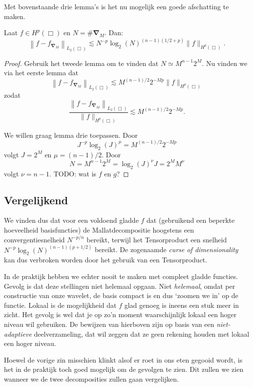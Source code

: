 Met bovenstaande drie lemma's is het nu mogelijk een goede afschatting te maken.
\begin{stelling}
\label{thm:fouttensor}
  Laat $f \in H^p(\Box)$ en $N = \#\boldsymbol{\nabla}_M$. Dan:
  \[
  \left\| f - f_{\boldsymbol\nabla_M} \right\|_{L_2(\Box)} \lesssim N^{-p} \log_2(N)^{(n-1)(1/2 + p)} \| f \|_{H^p(\Box)}.
  \]
\end{stelling}
\begin{proof}
  Gebruik het tweede lemma om te vinden dat $N \simeq M^{n-1}2^M$. Nu vinden we via het eerste lemma dat
  \[
  \left\| f - f_{\boldsymbol\nabla_M} \right\|_{L_2(\Box)} \lesssim M^{(n-1)/2}2^{-Mp}\| f \|_{H^p(\Box)}
  \]
  zodat
  \[
  \frac{\left\| f - f_{\boldsymbol\nabla_M}  \right\|_{L_2(\Box)}}{\| f \|_{H^p(\Box)}} \lesssim M^{(n-1)/2}2^{-Mp}.
  \]

  We willen graag lemma drie toepassen. Door
  \[
  J^{-p}\log_2(J)^\mu = M^{(n-1)/2} 2^{-Mp}
  \]
  volgt $J = 2^M$ en $\mu = (n-1)/2$. Door
  \[
  N = M^{n-1}2^M = \log_2(J)^\nu J = 2^M M^\nu
  \] volgt $\nu = n-1$. TODO: wat is $f$ en $g$?
\end{proof}

\subsection{Vergelijkend}
We vinden dus dat voor een voldoend gladde $f$ dat (gebruikend een beperkte hoeveelheid basisfuncties) de Mallatdecompositie hoogstens een convergentiesnelheid $N^{-p/n}$ bereikt, terwijl het Tensorproduct een snelheid $N^{-p} \log_2(N)^{(n-1)(p+1/2)}$ bereikt. De zogenaamde \emph{curse of dimensionality} kan dus verbroken worden door het gebruik van een Tensorproduct.


In de praktijk hebben we echter nooit te maken met compleet gladde functies. Gevolg is dat deze stellingen niet helemaal opgaan. Niet \emph{helemaal}, omdat per constructie van onze wavelet, de basis compact is en dus `zoomen we in' op de functie. Lokaal is de mogelijkheid dat $f$ glad genoeg is ineens een stuk meer in zicht. Het gevolg is wel dat je op zo'n moment waarschijnlijk lokaal een hoger niveau wil gebruiken. De bewijzen van hierboven zijn op basis van een \emph{niet-adaptieve} deelverzameling, dat wil zeggen dat ze geen rekening houden met lokaal een hoger niveau.

Hoewel de vorige zin misschien klinkt alsof er roet in ons eten gegooid wordt, is het in de praktijk toch goed mogelijk om de gevolgen te zien. Dit zullen we zien wanneer we de twee decomposities zullen gaan vergelijken.

